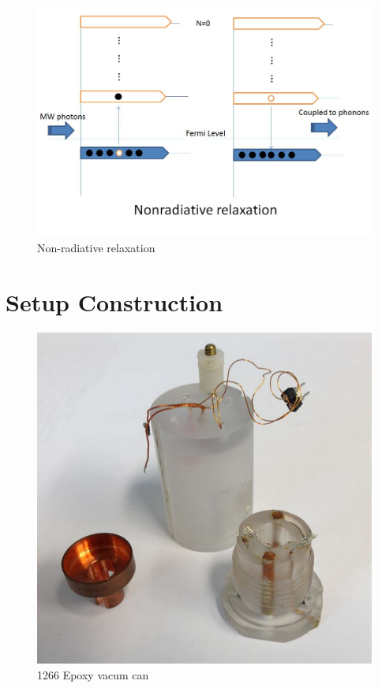 \documentclass[12pt]{ruthesis}
\begin{document}
\begin{figure}
  \centering
  \includegraphics[totalheight=8cm]{figures/nonradiative.JPG}
  \caption{Non-radiative relaxation}
  \label{nonradiative}
\end{figure}
 
 
 
 
 
 
\section{Setup Construction}\label{Construction}

\begin{figure}
  \centering
  \includegraphics[totalheight=8cm]{figures/vacumcan.JPG}
  \caption{1266 Epoxy vacum can}
  \label{vacum-can}
\end{figure}
 
\end{document}
